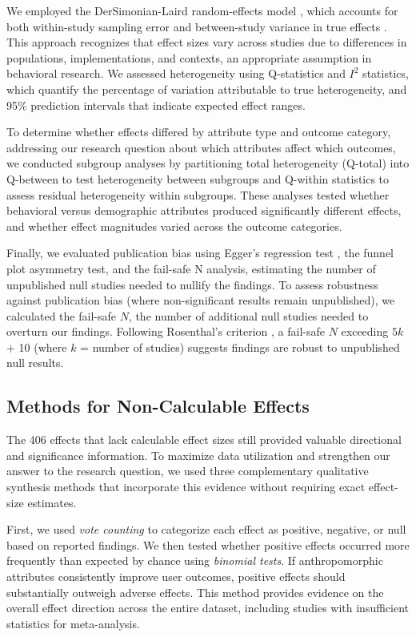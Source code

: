 \documentclass[manuscript,anonymous,sigconf]{acmart}
\begin{document}
We employed the DerSimonian-Laird random-effects model \citep{dersimonian1986meta}, which accounts for both within-study sampling error and between-study variance in true effects \cite{klein_effects_2025}. This approach recognizes that effect sizes vary across studies due to differences in populations, implementations, and contexts, an appropriate assumption in behavioral research. %
We assessed heterogeneity using Q-statistics and $I^2$ statistics, which quantify the percentage of variation attributable to true heterogeneity, and 95\% prediction intervals that indicate expected effect ranges. %

To determine whether effects differed by attribute type and outcome category, addressing our research question about which attributes affect which outcomes, we conducted subgroup analyses by partitioning total heterogeneity (Q-total) into Q-between to test heterogeneity between subgroups and Q-within statistics to assess residual heterogeneity within subgroups. These analyses tested whether behavioral versus demographic attributes produced significantly different effects, and whether effect magnitudes varied across the outcome categories. 

Finally, we evaluated publication bias using Egger's regression test \citep{egger1997bias}, the funnel plot asymmetry test, and the fail-safe N analysis, estimating the number of unpublished null studies needed to nullify the findings. To assess robustness against publication bias (where non-significant results remain unpublished), we calculated the fail-safe $N$, the number of additional null studies needed to overturn our findings. Following Rosenthal's criterion \citep{rosenthal1979file}, a fail-safe $N$ exceeding $5k$ + 10 (where $k$ = number of studies) suggests findings are robust to unpublished null results.

\subsection{Methods for Non-Calculable Effects}

The 406 effects that lack calculable effect sizes still provided valuable directional and significance information. To maximize data utilization and strengthen our answer to the research question, we used three complementary qualitative synthesis methods that incorporate this evidence without requiring exact effect-size estimates.

First, we used \textit{vote counting} to categorize each effect as positive, negative, or null based on reported findings. We then tested whether positive effects occurred more frequently than expected by chance using \textit{binomial tests}. If anthropomorphic attributes consistently improve user outcomes, positive effects should substantially outweigh adverse effects. This method provides evidence on the overall effect direction across the entire dataset, including studies with insufficient statistics for meta-analysis. 
\end{document}
